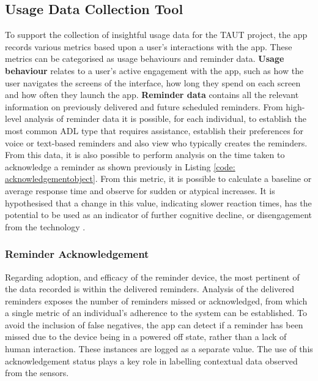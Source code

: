 
\subsection{Usage Data Collection Tool}
To support the collection of insightful usage data for the TAUT project, the app records various metrics based upon a user’s interactions with the app. These metrics can be categorised as usage behaviours and reminder data.
\newline \textbf{Usage behaviour} relates to a user’s active engagement with the app, such as how the user navigates the screens of the interface, how long they spend on each screen and how often they launch the app.
\newline \textbf{Reminder data} contains all the relevant information on previously delivered and future scheduled reminders. From high-level analysis of reminder data it is possible, for each individual, to establish the most common ADL type that requires assistance, establish their preferences for voice or text-based reminders and also view who typically creates the reminders.
From this data, it is also possible to perform analysis on the time taken to acknowledge a reminder as shown previously in Listing \ref{code: acknowledgementobject}. From this metric, it is possible to calculate a baseline or average response time and observe for sudden or atypical increases. It is hypothesised that a change in this value, indicating slower reaction times, has the potential to be used as an indicator of further cognitive decline, or disengagement from the technology \cite{Phillips2013}.

\subsubsection{Reminder Acknowledgement}
Regarding adoption, and efficacy of the reminder device, the most pertinent of the data recorded is within the delivered reminders. Analysis of the delivered reminders exposes the number of reminders missed or acknowledged, from which a single metric of an individual’s adherence to the system can be established. To avoid the inclusion of false negatives, the app can detect if a reminder has been missed due to the device being in a powered off state, rather than a lack of human interaction. These instances are logged as a separate value.
The use of this acknowledgement status plays a key role in labelling contextual data observed from the sensors.

